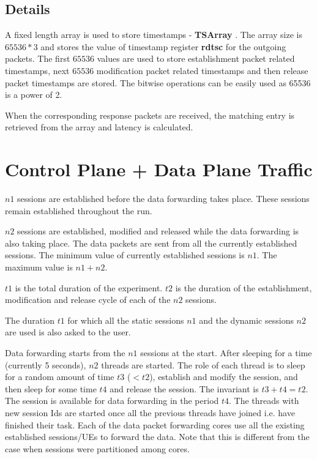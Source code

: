 \subsection{Details}
A fixed length array is used to store timestamps - \textbf{TSArray} . The
array size is $65536 * 3$ and stores the value of timestamp register \textbf{rdtsc} for the
outgoing packets. The first $65536$ values are used to store establishment packet related
timestamps, next $65536$ modification packet related timestamps and then release packet
timestamps are stored.  The bitwise operations can be easily used as 65536 is a power of 2.

When the corresponding response packets are received, the matching entry is retrieved from the array and latency is calculated. 

\section{Control Plane + Data Plane Traffic}

$n1$ sessions are established before the data forwarding takes place. These sessions remain established throughout the run.

$n2$ sessions are established, modified and released while the data forwarding is also taking place. The data packets are sent from all the currently established sessions. The minimum value of currently established sessions is $n1$. The maximum value is $n1+n2$.

$t1$ is the total duration of the experiment.
$t2$ is the  duration of the establishment, modification and release cycle of each of the $n2$ sessions.

The duration $t1$ for which all the static sessions $n1$ and the dynamic sessions $n2$ are used is also asked to the user.

Data forwarding starts from the $n1$ sessions at the start. After sleeping for a time (currently 5
seconds), $n2$ threads are started. The role of each thread is to sleep for a random amount of time
$t3$ ($<t2$), establish and modify the session, and then sleep for some time $t4$ and release the
session. The invariant is $t3+t4= t2$.   The session is available for data forwarding in the period $t4$.  The threads with new session Ids are started once all the previous threads have joined i.e. have finished their task.
Each of the data packet forwarding cores use all the existing established sessions/UEs to forward the data. Note that this is different from the case when sessions were partitioned among cores.

